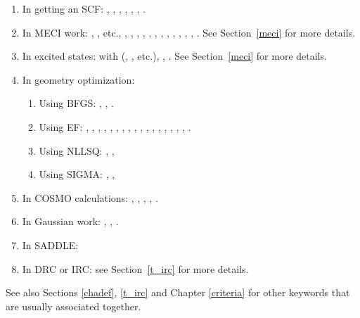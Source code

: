\begin{enumerate}
\item In getting an SCF:  , , ,
, , , .
\item In MECI work:  , , etc.,
, , , ,
, , , , ,
, , , . See
Section~\ref{meci} for more details.
\item In excited states:  with (, ,
etc.), , . See Section~\ref{meci} for more
details.
\item In geometry optimization:
\begin{enumerate}
\item  Using BFGS: , , .
\item Using EF: , , , ,
, , , , ,
, , , , , ,
, , .

\item Using NLLSQ: , , 
\item Using SIGMA: , , 
\end{enumerate}
\item In COSMO calculations: , , ,
, .
\item In Gaussian work: , , .
\item In SADDLE: 
\item In DRC or IRC: see Section~\ref{t_irc} for more details.
\end{enumerate}

See also Sections \ref{chadef}, \ref{t_irc} and Chapter \ref{criteria} for
other keywords that are usually associated together.
